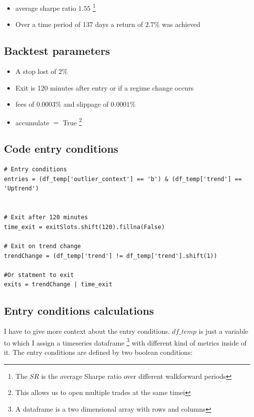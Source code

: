 \documentclass[12pt]{article}
\begin{document}
\begin{itemize}
    \item average sharpe ratio $1.55$ \footnote{The $\overline{SR}$ is the average Sharpe ratio over different walkforward periods}
    \item Over a time period of 137 days a return of $2.7\%$ was achieved
\end{itemize}


\subsection{Backtest parameters}

\begin{itemize}
    \item A stop lost of $2\%$
    \item Exit is 120 minutes after entry or if a regime change occurs
    \item fees of $0.0003\%$ and slippage of $0.0001\%$
    \item accumulate $=$ True \footnote{This allows us to open multiple trades at the same timei}
\end{itemize}


\subsection{Code entry conditions}

\begin{verbatim}
# Entry conditions
entries = (df_temp['outlier_context'] == 'b') & (df_temp['trend'] == 'Uptrend')


# Exit after 120 minutes
time_exit = exitSlots.shift(120).fillna(False)

# Exit on trend change
trendChange = (df_temp['trend'] != df_temp['trend'].shift(1))

#Or statment to exit
exits = trendChange | time_exit
\end{verbatim}




\newpage
\subsection{Entry conditions calculations}
I have to give more context about the entry conditions. $df\_temp$ is just a variable to which I assign a timeseries dataframe \footnote{A dataframe is a two dimensional array with rows and columns} with different kind of metrics inside of it. The entry conditions are defined by two boolean conditions:
\end{document}
